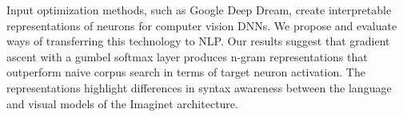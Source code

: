 Input optimization methods, such as Google Deep Dream, create interpretable representations of neurons for computer vision DNNs. We propose and evaluate ways of transferring this technology to NLP. Our results suggest that gradient ascent with a gumbel softmax layer produces n-gram representations that outperform naive corpus search in terms of target neuron activation. The representations highlight differences in syntax awareness between the language and visual models of the Imaginet architecture.
